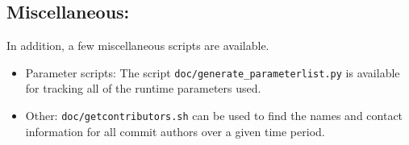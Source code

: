 \subsection{Miscellaneous:} \label{ssec:miscScripts}
In addition, a few miscellaneous scripts are available.
\begin{itemize}
	\item Parameter scripts: The script \texttt{doc/generate\_parameterlist.py} is available for tracking all of the runtime parameters used.
	\item Other: \texttt{doc/getcontributors.sh} can be used to find the names and contact information for all commit authors over a given time period. 
\end{itemize}
